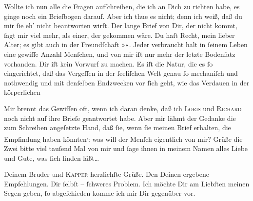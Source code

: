 \pstart
           Wollte ich nun alle die Fragen aufſchreiben, die ich an Dich zu richten habe, es
               ginge noch ein Briefbogen darauf. Aber ich thue es nicht; denn ich weiß, daß du mir
               ſie eh’ nicht beantworten wirſt. Der lange Brief\strikeout{,} von
               Dir, der nicht kommt, ſagt mir viel mehr, als 
               einer, der gekom{\pb}men wäre. Du haſt Recht, mein
               lieber Alter; es gibt auch in der Freundſchaft »\label{K_L02669-16v}\label{K_L02669-16}«. Jeder verbraucht halt in ſeinem Leben eine gewiſſe Anzahl Menſchen, und von
               mir iſt nur mehr der letzte Bodenſatz vorhanden. Dir iſt kein Vorwurf zu machen. Es
               iſt die Natur, die es ſo eingerichtet, daß das Vergeſſen in der ſeeliſchen Welt genau
               ſo  mechaniſch und nothwendig und mit denſelben
               Endzwecken vor ſich geht, wie das Verdauen in der körperlichen{\dotsfour}\pend
           
\pstart
           Mir brennt das Gewiſſen oft, wenn ich daran denke, daß ich \textsc{Loris} und \textsc{Richard} noch nicht auf ihre Brieſe geantwortet habe. Aber mir lähmt der Gedanke die zum
               Schreiben angeſetzte Hand, daß ſie, wenn ſie meinen Brief erhalten, die Empfindung
               haben könnten\substVorne{}\textsuperscript{\textcolor{gray}{,}}\substDazwischen{}:\substHinten{} was will der Menſch eigentlich von mir? Grüße die Zwei bitte viel {\pb}tauſend Mal von mir und ſage ihnen in meinem Namen
               alles Liebe und Gute, was ſich finden läßt{\dots}\pend
           
\pstart
           Deinem Bruder und \textsc{Kapper} herzlichſte Grüße. Den Deinen ergebene Empfehlungen. Dir ſelbſt – ſchweres
               Problem. Ich möchte Dir am Liebſten meinen Segen geben, ſo abgeſchieden komme ich mir
               Dir gegenüber vor.\pend
           
